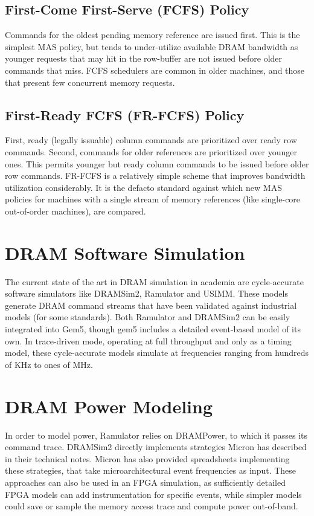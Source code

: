 \subsection{First-Come First-Serve (FCFS) Policy}\label{fcfs} Commands for the
oldest pending memory reference are issued first. This is the simplest MAS
policy, but tends to under-utilize available DRAM bandwidth as younger requests
that may hit in the row-buffer are not issued before older commands that miss.
FCFS schedulers are common in older machines, and those that present few
concurrent memory requests.

\subsection{First-Ready FCFS (FR-FCFS)\cite{frfcfs} Policy}\label{frfcfs}
First, ready (legally issuable) column commands are prioritized over ready row
commands. Second, commands for older references are prioritized over younger
ones. This permits younger but ready column commands to be issued before older
row commands. FR-FCFS is a relatively simple scheme that improves bandwidth
utilization considerably. It is the defacto standard against which new MAS
policies for machines with a single stream of memory references (like
single-core out-of-order machines), are compared.

\section{DRAM Software Simulation}

The current state of the art in DRAM simulation in academia are cycle-accurate
software simulators like DRAMSim2\cite{dramsim}, Ramulator\cite{ramulator} and
USIMM\cite{usimm}. These models generate DRAM command streams that have been
validated against industrial models (for some standards). Both Ramulator and
DRAMSim2 can be easily integrated into Gem5\cite{gem5}, though gem5 includes a
detailed event-based model of its own\cite{gem5event}. In trace-driven mode,
operating at full throughput and only as a timing model, these cycle-accurate
models simulate at frequencies ranging from hundreds of KHz to ones of
MHz\cite{ramulator}.

\section{DRAM Power Modeling}

In order to model power, Ramulator relies on DRAMPower\cite{drampower}, to
which it passes its command trace. DRAMSim2 directly implements strategies
Micron has described in their technical notes\cite{micronpower}. Micron has
also provided spreadsheets implementing these strategies, that take
microarchitectural event frequencies as input. These approaches can also be
used in an FPGA simulation, as sufficiently detailed FPGA models can add
instrumentation for specific events, while simpler models could save or sample
the memory access trace and compute power out-of-band.
